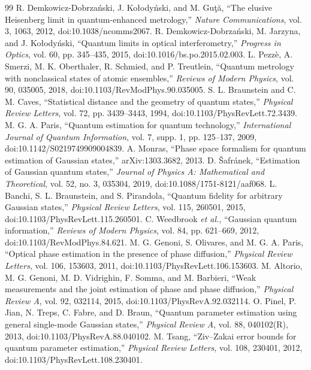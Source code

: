 \documentclass[a4paper,11pt]{article}
\numberwithin{equation}{section}
\begin{document}
\begin{thebibliography}{99}
 R. Demkowicz-Dobrza\'nski, J. Ko\l{}ody\'nski, and M. Gu\c{t}\u{a}, ``The elusive Heisenberg limit in quantum-enhanced metrology,'' \emph{Nature Communications}, vol. 3, 1063, 2012, doi:10.1038/ncomms2067.
 R. Demkowicz-Dobrza\'nski, M. Jarzyna, and J. Ko\l{}ody\'nski, ``Quantum limits in optical interferometry,'' \emph{Progress in Optics}, vol. 60, pp. 345--435, 2015, doi:10.1016/bs.po.2015.02.003.
 L. Pezz\`e, A. Smerzi, M. K. Oberthaler, R. Schmied, and P. Treutlein, ``Quantum metrology with nonclassical states of atomic ensembles,'' \emph{Reviews of Modern Physics}, vol. 90, 035005, 2018, doi:10.1103/RevModPhys.90.035005.
 S. L. Braunstein and C. M. Caves, ``Statistical distance and the geometry of quantum states,'' \emph{Physical Review Letters}, vol. 72, pp. 3439--3443, 1994, doi:10.1103/PhysRevLett.72.3439.
 M. G. A. Paris, ``Quantum estimation for quantum technology,'' \emph{International Journal of Quantum Information}, vol. 7, supp. 1, pp. 125--137, 2009, doi:10.1142/S0219749909004839.
 A. Monras, ``Phase space formalism for quantum estimation of Gaussian states,'' arXiv:1303.3682, 2013.
 D. \v{S}afr\'anek, ``Estimation of Gaussian quantum states,'' \emph{Journal of Physics A: Mathematical and Theoretical}, vol. 52, no. 3, 035304, 2019, doi:10.1088/1751-8121/aaf068.
 L. Banchi, S. L. Braunstein, and S. Pirandola, ``Quantum fidelity for arbitrary Gaussian states,'' \emph{Physical Review Letters}, vol. 115, 260501, 2015, doi:10.1103/PhysRevLett.115.260501.
 C. Weedbrook \emph{et al.}, ``Gaussian quantum information,'' \emph{Reviews of Modern Physics}, vol. 84, pp. 621--669, 2012, doi:10.1103/RevModPhys.84.621.
 M. G. Genoni, S. Olivares, and M. G. A. Paris, ``Optical phase estimation in the presence of phase diffusion,'' \emph{Physical Review Letters}, vol. 106, 153603, 2011, doi:10.1103/PhysRevLett.106.153603.
 M. Altorio, M. G. Genoni, M. D. Vidrighin, F. Somma, and M. Barbieri, ``Weak measurements and the joint estimation of phase and phase diffusion,'' \emph{Physical Review A}, vol. 92, 032114, 2015, doi:10.1103/PhysRevA.92.032114.
 O. Pinel, P. Jian, N. Treps, C. Fabre, and D. Braun, ``Quantum parameter estimation using general single-mode Gaussian states,'' \emph{Physical Review A}, vol. 88, 040102(R), 2013, doi:10.1103/PhysRevA.88.040102.
 M. Tsang, ``Ziv--Zakai error bounds for quantum parameter estimation,'' \emph{Physical Review Letters}, vol. 108, 230401, 2012, doi:10.1103/PhysRevLett.108.230401.

\end{thebibliography}
\end{document}
